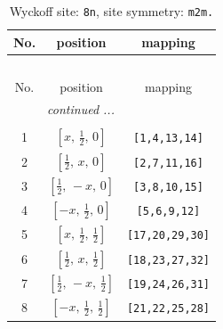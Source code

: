 \documentclass[fleqn,8pt]{jsarticle}
\begin{document}
\begin{longtable}{ccc}
\caption{Wyckoff site: {\tt 8n}, site symmetry: {\tt m2m.}}
 \\
 \hline \hline
No. & position & mapping \\ \hline \endfirsthead

\multicolumn{2}{l}{\tablename\ \thetable{}} \\
 \hline \hline
No. & position & mapping \\ \hline \endhead

 \hline \hline
\multicolumn{2}{r}{\footnotesize\it continued ...} \\ \endfoot

 \hline \hline
\multicolumn{2}{r}{} \\ \endlastfoot

1 & $\left[ x,\, \frac{1}{2},\, 0 \right]$ & {\tt [1,4,13,14]} \\ \hline
2 & $\left[ \frac{1}{2},\, x,\, 0 \right]$ & {\tt [2,7,11,16]} \\ \hline
3 & $\left[ \frac{1}{2},\, - x,\, 0 \right]$ & {\tt [3,8,10,15]} \\ \hline
4 & $\left[ - x,\, \frac{1}{2},\, 0 \right]$ & {\tt [5,6,9,12]} \\ \hline
5 & $\left[ x,\, \frac{1}{2},\, \frac{1}{2} \right]$ & {\tt [17,20,29,30]} \\ \hline
6 & $\left[ \frac{1}{2},\, x,\, \frac{1}{2} \right]$ & {\tt [18,23,27,32]} \\ \hline
7 & $\left[ \frac{1}{2},\, - x,\, \frac{1}{2} \right]$ & {\tt [19,24,26,31]} \\ \hline
8 & $\left[ - x,\, \frac{1}{2},\, \frac{1}{2} \right]$ & {\tt [21,22,25,28]} \\
\end{longtable}
\renewcommand{\arraystretch}{1.2}
\end{document}
